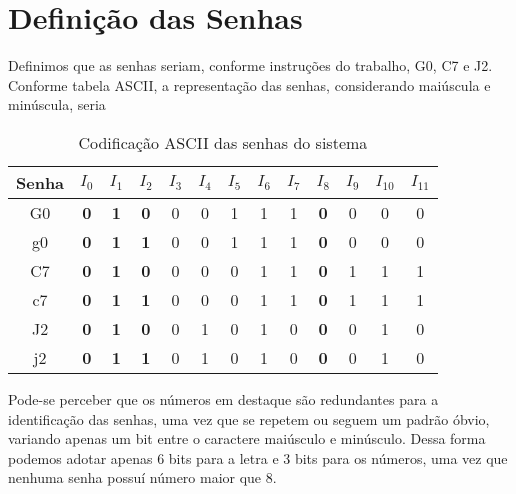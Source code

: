 \documentclass[12pt,a4paper]{article}
\begin{document}
\section{Definição das Senhas}

Definimos que as senhas seriam, conforme instruções do trabalho, G0, C7 e J2. Conforme tabela ASCII, a representação das senhas, considerando maiúscula e minúscula, seria

\bigskip

\begin{table}[hb]
\begin{center}
\begin{tabular}{c||cccccccc|cccc}
Senha & $I_0$ & $I_1$ & $I_2$ & $I_3$ & $I_4$ & $I_5$ & $I_6$ & $I_7$ & $I_8$ & $I_9$ & $I_{10}$ & $I_{11}$ \\
\hline
G0 & {\bf 0} & {\bf 1} & {\bf 0} & 0 & 0 & 1 & 1 & 1 & {\bf 0} & 0 & 0 & 0 \\
g0 & {\bf 0} & {\bf 1} & {\bf 1} & 0 & 0 & 1 & 1 & 1 & {\bf 0} & 0 & 0 & 0 \\
\hline
\hline
C7 & {\bf 0} & {\bf 1} & {\bf 0} & 0 & 0 & 0 & 1 & 1 & {\bf 0} & 1 & 1 & 1 \\
c7 & {\bf 0} & {\bf 1} & {\bf 1} & 0 & 0 & 0 & 1 & 1 & {\bf 0} & 1 & 1 & 1 \\
\hline
\hline
J2 & {\bf 0} & {\bf 1} & {\bf 0} & 0 & 1 & 0 & 1 & 0 & {\bf 0} & 0 & 1 & 0 \\
j2 & {\bf 0} & {\bf 1} & {\bf 1} & 0 & 1 & 0 & 1 & 0 & {\bf 0} & 0 & 1 & 0 \\
\end{tabular}
\end{center}
\caption{Codificação ASCII das senhas do sistema}
\end{table}

Pode-se perceber que os números em destaque são redundantes para a identificação das senhas, uma vez que se repetem ou seguem um padrão óbvio, variando apenas um bit entre o caractere maiúsculo e minúsculo. Dessa forma podemos adotar apenas 6 bits para a letra e 3 bits para os números, uma vez que nenhuma senha possuí número maior que 8.
\end{document}
